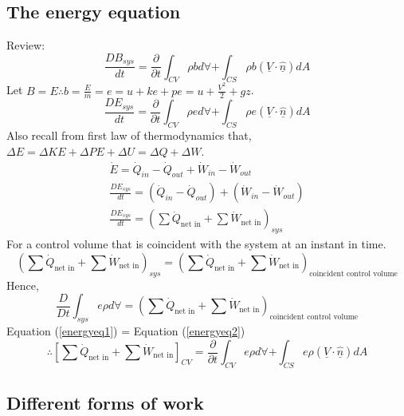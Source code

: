 \documentclass[class=report, crop=false, 12pt,a4paper]{standalone}
\begin{document}
\subsection{The energy equation}
Review:
\begin{equation}
  \frac{DB_{sys}}{dt} = \frac{\partial}{\partial t} \int_{CV} \rho b d \forall + \int_{CS} \rho b (\underline{V}\cdot \underline{\hat{n}}) dA
\end{equation}
Let $B=E \therefore b = \frac{E}{m} = e = u + ke + pe = u + \frac{V^2}{2} + gz$.
\begin{equation}
  \frac{DE_{sys}}{dt} = \frac{\partial}{\partial t} \int_{CV} \rho e d \forall + \int_{CS} \rho e (\underline{V}\cdot \underline{\hat{n}}) dA
\end{equation}
Also recall from first law of thermodynamics that, $\Delta E = \Delta KE + \Delta PE + \Delta U = \Delta Q + \Delta W$.
\begin{gather}
  \dot{E} = \dot{Q}_{in} - \dot{Q}_{out} + \dot{W}_{in} - \dot{W}_{out}\\
  \frac{DE_{sys}}{dt} = (\dot{Q}_{in} - \dot{Q}_{out}) + (\dot{W}_{in} - \dot{W}_{out})\\
  \frac{DE_{sys}}{dt} = \left( \sum \dot{Q}_{\textrm{net in}} + \sum \dot{W}_{\textrm{net in}} \right)_{sys} \label{energyeq1}
\end{gather}
For a control volume that is coincident with the system at an instant in time.
\begin{equation}
  \left( \sum \dot{Q}_{\textrm{net in}} + \sum \dot{W}_{\textrm{net in}} \right)_{sys} = \left( \sum \dot{Q}_{\textrm{net in}} + \sum \dot{W}_{\textrm{net in}} \right)_{\textrm{coincident control volume}}
\end{equation}
Hence,
\begin{equation}
  \frac{D}{Dt} \int_{sys} e \rho d \forall = \left( \sum \dot{Q}_{\textrm{net in}} + \sum \dot{W}_{\textrm{net in}} \right)_{\textrm{coincident control volume}} \label{energyeq2}
\end{equation}
Equation (\ref{energyeq1}) = Equation (\ref{energyeq2})
\begin{equation}
  \therefore \left[ \sum \dot{Q}_{\textrm{net in}} + \sum \dot{W}_{\textrm{net in}} \right]_{CV} = \frac{\partial}{\partial t} \int_{CV} e \rho d \forall + \int_{CS} e \rho (\underline{V} \cdot \underline{\hat{n}}) dA \label{energyeq3}
\end{equation}
\subsection{Different forms of work}
\end{document}
